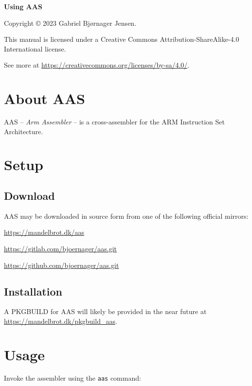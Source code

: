 \documentclass[a4paper]{article}
\title{\documenttitle}
\author{Gabriel Bjørnager Jensen}
\date{2023-12-31}
\newcommand{\documenttitle}{Using AAS}
\begin{document}
	\thispagestyle{empty}

	\vspace*{\fill}
	\centerline{\huge\bfseries\documenttitle}
	\vspace*{\fill}

	\clearpage
	\begin{center}
		Copyright © 2023 Gabriel Bjørnager Jensen.

		This manual is licensed under a Creative Commons Attribution-ShareAlike-4.0 International license.

		See more at \url{https://creativecommons.org/licenses/by-sa/4.0/}.
	\end{center}

	\clearpage
	\tableofcontents

	\clearpage
	\section{About AAS}
		AAS -- \textit{Arm Assembler} -- is a cross-assembler for the ARM Instruction Set Architecture.

	\clearpage
	\section{Setup}
		\subsection{Download}
			AAS may be downloaded in source form from one of the following official mirrors:

			\begin{center}
				\begin{varwidth}{\linewidth}
					\url{https://mandelbrot.dk/aas}

					\url{https://gitlab.com/bjoernager/aas.git}

					\url{https://github.com/bjoernager/aas.git}
				\end{varwidth}
			\end{center}

		\subsection{Installation}
			A PKGBUILD for AAS will likely be provided in the near future at \url{https://mandelbrot.dk/pkgbuild_aas}.

	\clearpage
	\section{Usage}
		Invoke the assembler using the \texttt{aas} command:
\end{document}
